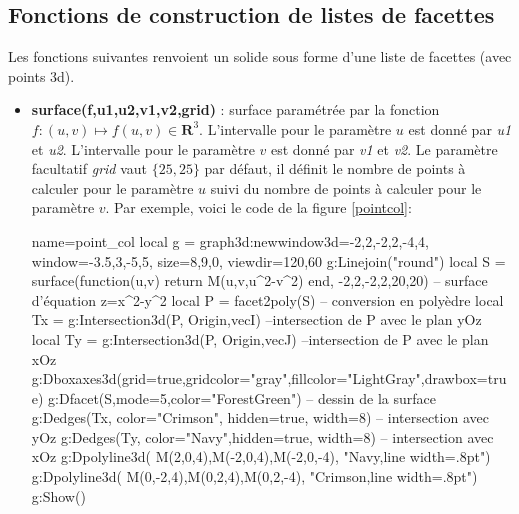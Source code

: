 \documentclass[%
10pt,%
a4paper,%
french,%
]%
{article}%
\begin{document}
\subsection{Fonctions de construction de listes de facettes}

Les fonctions suivantes renvoient un solide sous forme d'une liste de facettes (avec points 3d).
\begin{itemize}
    \item \textbf{surface(f,u1,u2,v1,v2,grid)} : surface paramétrée par la fonction $f\colon(u,v) \mapsto f(u,v)\in \mathbf R^3$. L'intervalle pour le paramètre $u$ est donné par \emph{u1} et \emph{u2}. L'intervalle pour le paramètre $v$ est donné par \emph{v1} et \emph{v2}. Le paramètre facultatif \emph{grid} vaut $\{25,25\}$ par défaut, il définit le nombre de points à calculer pour le paramètre $u$ suivi du nombre de points à calculer pour le paramètre $v$. Par exemple, voici le code de la figure \ref{pointcol}:
\begin{Luacode}
\begin{luadraw}{name=point_col}
local g = graph3d:new{window3d={-2,2,-2,2,-4,4}, window={-3.5,3,-5,5}, size={8,9,0}, viewdir={120,60}}
g:Linejoin("round")
local S = surface(function(u,v) return M(u,v,u^2-v^2) end, -2,2,-2,2,{20,20}) -- surface d'équation z=x^2-y^2
local P = facet2poly(S) -- conversion en polyèdre
local Tx = g:Intersection3d(P, {Origin,vecI}) --intersection de P avec le plan yOz
local Ty = g:Intersection3d(P, {Origin,vecJ}) --intersection de P avec le plan xOz
g:Dboxaxes3d({grid=true,gridcolor="gray",fillcolor="LightGray",drawbox=true})
g:Dfacet(S,{mode=5,color="ForestGreen"}) -- dessin de la surface
g:Dedges(Tx, {color="Crimson", hidden=true, width=8}) -- intersection avec yOz
g:Dedges(Ty, {color="Navy",hidden=true, width=8}) -- intersection avec xOz
g:Dpolyline3d( {M(2,0,4),M(-2,0,4),M(-2,0,-4)}, "Navy,line width=.8pt")
g:Dpolyline3d( {M(0,-2,4),M(0,2,4),M(0,2,-4)}, "Crimson,line width=.8pt")
g:Show()
\end{luadraw}
\end{Luacode}


\end{itemize}
\end{document}
